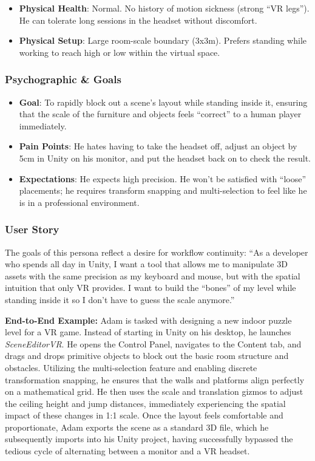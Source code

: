 \documentclass[inscr,ack,preface]{dithesis}
\begin{document}
\begin{itemize}
  \item \textbf{Physical Health}: Normal. No history of motion sickness (strong ``VR legs''). He can tolerate long sessions
        in the headset without discomfort.
  \item \textbf{Physical Setup}: Large room-scale boundary (3x3m). Prefers standing while working to reach high or low within the virtual space.
\end{itemize}

\subsubsection{Psychographic \& Goals}

\begin{itemize}
  \item \textbf{Goal}: To rapidly block out a scene's layout while standing inside it,
        ensuring that the scale of the furniture and objects feels ``correct'' to a human player immediately.
  \item \textbf{Pain Points}: He hates having to take the headset off, adjust an object by 5cm in Unity on his monitor,
        and put the headset back on to check the result.
  \item \textbf{Expectations}: He expects high precision. He won't be satisfied with ``loose'' placements; he requires transform
        snapping and multi-selection to feel like he is in a professional environment.
\end{itemize}

\subsubsection{User Story}

The goals of this persona reflect a desire for workflow continuity: ``As a developer who spends all day in Unity, I want a tool that allows me to manipulate 3D assets with the same precision as
my keyboard and mouse, but with the spatial intuition that only VR provides. I want to build the ``bones'' of my level while standing
inside it so I don't have to guess the scale anymore.''

\textbf{End-to-End Example:} Adam is tasked with designing a new indoor puzzle level for a VR game.
Instead of starting in Unity on his desktop, he launches \textit{SceneEditorVR}.
He opens the Control Panel, navigates to the Content tab, and drags and drops primitive objects to
block out the basic room structure and obstacles. Utilizing the multi-selection feature and enabling discrete transformation snapping,
he ensures that the walls and platforms align perfectly on a mathematical grid. He then uses the scale and translation gizmos to adjust
the ceiling height and jump distances, immediately experiencing the spatial impact of these changes in 1:1 scale. Once the layout
feels comfortable and proportionate, Adam exports the scene as a standard 3D file, which he subsequently imports into his Unity project,
having successfully bypassed the tedious cycle of alternating between a monitor and a VR headset.
\end{document}
